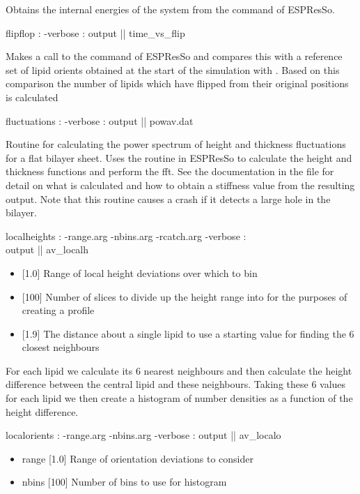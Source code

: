 Obtains the internal energies of the system from the  command of ESPResSo.
\begin{code}
  flipflop : -verbose : output || time_vs_flip
\end{code}
Makes a call to the  command of
ESPResSo and compares this with a reference set of lipid orients
obtained at the start of the simulation with
. Based on this comparison the number of
lipids which have flipped from their original positions is calculated
\begin{code}
  fluctuations : -verbose : output || powav.dat
\end{code}
Routine for calculating the power spectrum of height and thickness
fluctuations for a flat bilayer sheet. Uses the 
routine in ESPResSo to calculate the height and thickness functions
and perform the fft. See the documentation in the file
 for detail on what is calculated and how to
obtain a stiffness value from the resulting output. Note that this
routine causes a crash if it detects a large hole in the bilayer.
\begin{code}
  localheights : -range.arg -nbins.arg -rcatch.arg -verbose : \\
                 output || av_localh
\end{code}
\begin{itemize}
\item {} [1.0] Range of local height deviations over which to
  bin
\item {} [100] Number of slices to divide up the height range
  into for the purposes of creating a profile
\item {} [1.9] The distance about a single lipid to use a
  starting value for finding the 6 closest neighbours
\end{itemize}
For each lipid we calculate its 6 nearest neighbours and then
calculate the height difference between the central lipid and these
neighbours. Taking these 6 values for each lipid we then create a
histogram of number densities as a function of the height difference.
\begin{code}
  localorients : -range.arg -nbins.arg -verbose : output || av_localo
\end{code}
\begin{itemize}
    \item range [1.0] Range of orientation deviations to consider
    \item nbins [100] Number of bins to use for histogram
\end{itemize}
